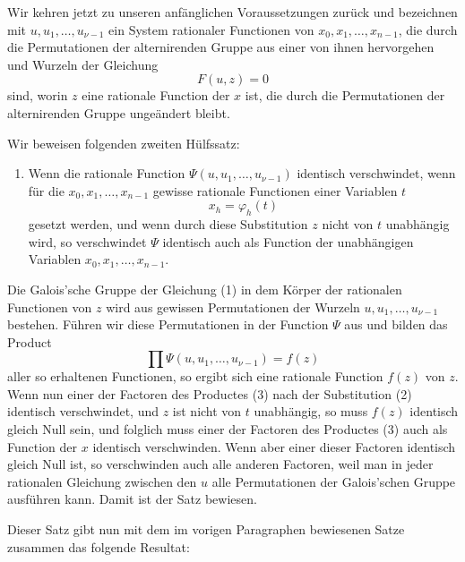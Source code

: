 \documentclass[11pt]{article}
\begin{document}
Wir kehren jetzt zu unseren anfänglichen Voraussetzungen zurück und bezeichnen mit \(u,u_1,\ldots,u_{\nu-1}\) ein System rationaler Functionen von \(x_0,x_1,\ldots,x_{n-1}\), die durch die Permutationen der alternirenden Gruppe aus einer von ihnen hervorgehen und Wurzeln der Gleichung
\begin{equation}
F(u,z)=0
\tag{1}
\end{equation}
sind, worin \(z\) eine rationale Function der \(x\) ist, die durch die Permutationen der alternirenden Gruppe ungeändert bleibt.

Wir beweisen folgenden zweiten Hülfssatz:

\begin{enumerate}[label=\arabic*.,start=2]
\item Wenn die rationale Function \(\Psi(u,u_1,\ldots,u_{\nu-1})\) identisch verschwindet, wenn für die \(x_0,x_1,\ldots,x_{n-1}\) gewisse rationale Functionen einer Variablen \(t\)
\begin{equation}
x_h=\varphi_h(t)
\tag{2}
\end{equation}
gesetzt werden, und wenn durch diese Substitution \(z\) nicht von \(t\) unabhängig wird, so verschwindet \(\Psi\) identisch auch als Function der unabhängigen Variablen \(x_0,x_1,\ldots,x_{n-1}\).
\end{enumerate}

Die Galois'sche Gruppe der Gleichung (1) in dem Körper der rationalen Functionen von \(z\) wird aus gewissen Permutationen der Wurzeln \(u,u_1,\ldots,u_{\nu-1}\) bestehen. Führen wir diese Permutationen in der Function \(\Psi\) aus und bilden das Product
\begin{equation}
\prod\Psi(u,u_1,\ldots,u_{\nu-1})=f(z)
\tag{3}
\end{equation}
aller so erhaltenen Functionen, so ergibt sich eine rationale Function \(f(z)\) von \(z\). Wenn nun einer der Factoren des Productes (3) nach der Substitution (2) identisch verschwindet, und \(z\) ist nicht von \(t\) unabhängig, so muss \(f(z)\) identisch gleich Null sein, und folglich muss einer der Factoren des Productes (3) auch als Function der \(x\) identisch verschwinden. Wenn aber einer dieser Factoren identisch gleich Null ist, so verschwinden auch alle anderen Factoren, weil man in jeder rationalen Gleichung zwischen den \(u\) alle Permutationen der Galois'schen Gruppe ausführen kann. Damit ist der Satz bewiesen.

Dieser Satz gibt nun mit dem im vorigen Paragraphen bewiesenen Satze zusammen das folgende Resultat:
\end{document}
